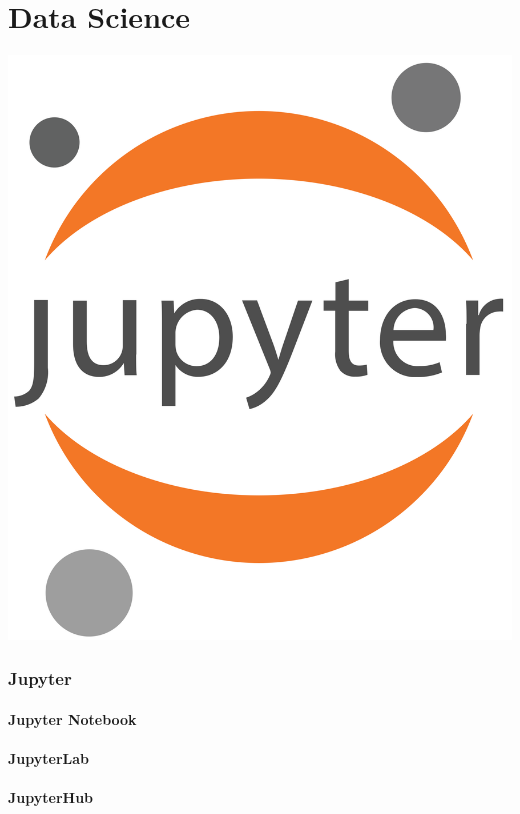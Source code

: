 \documentclass[./FDA_document_template.tex]{subfiles}
\begin{document}
\renewcommand{\onlyinsubfile}[1]{#1}
\renewcommand{\notinsubfile}[1]{}
 
\setcounter{part}{10}
\pagestyle{Standard}

\part{Data Science}
 
 
  


\begin{center}
 \includegraphics[width=.10\textwidth]{./logos/2000px-Jupyter_logo.png}
\end{center}
 
 
 \section{Jupyter}

\lipsum[1]

\subsection{Jupyter Notebook}

\lipsum[2]

\subsection{JupyterLab}

\lipsum[3]

\subsection{JupyterHub}

\lipsum[4]

\bigskip
 
\end{document}
